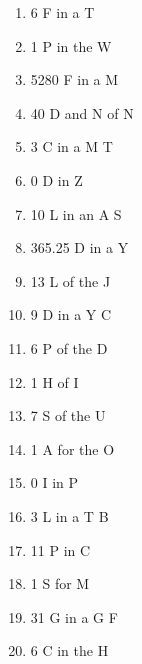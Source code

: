 \documentclass[10pt]{article}
\begin{document}
\begin{multicols}{4}
\begin{enumerate}[label=\arabic*.]
    \item 6 \w F{}  in a \w T{}
     \item 1 \w P{}  in the \w W{}
     \item 5280 \w F{}  in a \w M{}
     \item 40 \w D{}  and \w N{}  of \w N{}
     \item 3 \w C{}  in a \w M{}  T
    
    \item 0 \w D{}  in \w Z{}
     \item 10 \w L{}  in an \w A{}  S
    \item 365.25 \w D{}  in a \w Y{}
     \item 13 \w L{}  of the \w J{}
     \item 9 \w D{}  in a \w Y{}  C
    
    \item 6 \w P{}  of the \w D{}
     \item 1 \w H{}  of \w I{}
     \item 7 \w S{}  of the \w U{}
     \item 1 \w A{}  for the \w O{}
     \item 0 \w I{}  in \w P{}
     
    \item 3 \w L{}  in a \w T{}  B
    \item 11 \w P{}  in \w C{}
     \item 1 \w S{}  for \w M{}
     \item 31 \w G{}  in a \w G{}  F
    \item 6 \w C{}  in the \w H{}
     
\end{enumerate}

\end{multicols}
\end{document}
